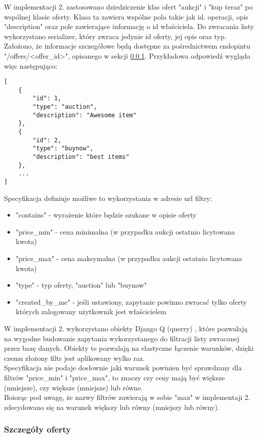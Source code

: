 \documentclass[12pt, notitlepage]{article}
\begin{document}
W implementacji 2. zastosowano dziedziczenie klas ofert "aukcji" i "kup teraz" po wspólnej klasie oferty. Klasa ta zawiera wspólne pola takie jak id. operacji, opis "description" oraz pole zawierające informację o id właściciela. Do zwracania listy wykorzystano serializer, który zwraca jedynie id oferty, jej opis oraz typ. Założono, że informacje szczegółowe będą dostępne za pośrednictwem endopintu "/offers/<offer\_id>", opisanego w sekcji \ref{sec:details}. Przykładowa odpowiedź wygląda więc następująco:
\begin{lstlisting}
[
    {     
        "id": 1,
        "type": "auction",
        "description": "Awesome item"
    },
    {
        "id": 2,
        "type": "buynow",
        "description": "best items"
    },
    ...
]	
\end{lstlisting}

Specyfikacja definiuje możliwe to wykorzystania w adresie url filtry:
\begin{itemize}
    \item "contains" - wyrażenie które będzie szukane w opisie oferty
    \item "price\_min" - cena minimalna (w przypadku aukcji ostatnio licytowana kwota)
    \item "price\_max" - cena maksymalna (w przypadku aukcji ostatnio licytowana kwota)
    \item "type" - typ oferty, "auction" lub "buynow"
    \item "created\_by\_me" - jeśli ustawiony, zapytanie powinno zwracać tylko oferty których zalogowany użytkownik jest właścicielem
\end{itemize}

W implementacji 2. wykorzystano obiekty Django Q (querry) \cite{django_q}, które pozwalają na wygodne budowanie zapytania wykorzystanego do filtracji listy zwracanej przez bazę danych. Obiekty te pozwalają na elastyczne łączenie warunków, dzięki czemu złożony filtr jest aplikowany wylko raz. \\


Specyfikacja nie podaje dosłownie jaki warunek powinien być sprawdzany dla filtrów "price\_min" i "price\_max", to znaczy czy ceny mają być większe (mniejsze), czy większe (mniejsze) lub równe. \\
Boiorąc pod uwagę, że nazwy filtrów zawierają w sobie "max" w implementaji 2. zdecydowano się na warunek większy lub równy (mniejszy lub równy). \\

\subsubsection{Szczegóły oferty}\label{sec:details}
\end{document}
